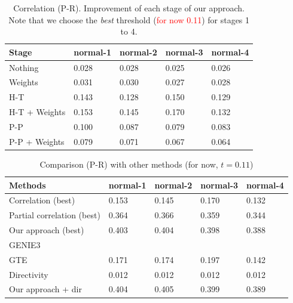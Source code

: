 \documentclass[wcp]{jmlr}
\begin{document}
\begin{table}[htbp]
\centering
\caption{Correlation (P-R). Improvement of each stage of our approach. Note that we choose the
         \textit{best} threshold (\textcolor{red}{for now 0.11}) for stages 1 to 4.}
\begin{tabular}{*{5}{l}}
\toprule
Stage               & normal-1 & normal-2 & normal-3 & normal-4 \\
\midrule
Nothing             & 0.028 & 0.028 & 0.025 & 0.026\\
Weights             & 0.031 & 0.030 & 0.027 & 0.028\\
H-T                 & 0.143 & 0.128 & 0.150 & 0.129\\
H-T + Weights       & 0.153 & 0.145 & 0.170 & 0.132\\
P-P                 & 0.100 & 0.087 & 0.079 & 0.083\\
P-P + Weights       & 0.079 & 0.071 & 0.067 & 0.064\\
\bottomrule
\end{tabular}
\end{table}

\begin{table}[htb]
\centering
\caption{Comparison (P-R) with other methods (for now, $t = 0.11$)}
\begin{tabular}{*{5}{l}}
\toprule
Methods             & normal-1 & normal-2 & normal-3 & normal-4 \\
\midrule
Correlation (best)         & 0.153 & 0.145 & 0.170 & 0.132 \\
Partial correlation (best) & 0.364 & 0.366 & 0.359 & 0.344 \\
Our approach (best)        & 0.403 & 0.404 & 0.398 & 0.388 \\
GENIE3                     & & & & \\
GTE                        & 0.171 & 0.174 & 0.197 & 0.142 \\
Directivity                & 0.012 & 0.012 & 0.012 & 0.012 \\
Our approach + dir         & 0.404 & 0.405 & 0.399 & 0.389 \\
\bottomrule
\end{tabular}
\end{table}
\end{document}
